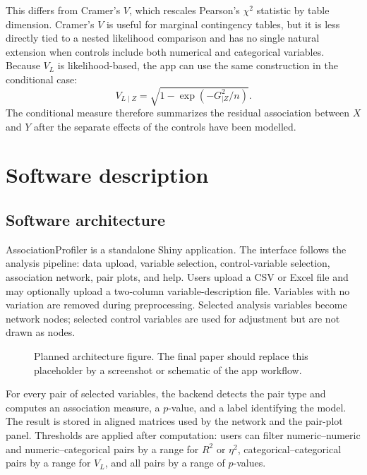 \documentclass[preprint,12pt,a4paper]{elsarticle}
\begin{document}
This differs from Cramer's $V$, which rescales Pearson's $\chi^2$ statistic by table dimension. Cramer's $V$ is useful for marginal contingency tables, but it is less directly tied to a nested likelihood comparison and has no single natural extension when controls include both numerical and categorical variables. Because $V_L$ is likelihood-based, the app can use the same construction in the conditional case:
\[
V_{L\mid Z} = \sqrt{1-\exp(-G^2_{\mid Z}/n)}.
\]
The conditional measure therefore summarizes the residual association between $X$ and $Y$ after the separate effects of the controls have been modelled.

\section{Software description}

\subsection{Software architecture}

AssociationProfiler is a standalone Shiny application. The interface follows the analysis pipeline: data upload, variable selection, control-variable selection, association network, pair plots, and help. Users upload a CSV or Excel file and may optionally upload a two-column variable-description file. Variables with no variation are removed during preprocessing. Selected analysis variables become network nodes; selected control variables are used for adjustment but are not drawn as nodes.

\begin{figure}[!ht]
\centering
{}
\caption{Planned architecture figure. The final paper should replace this placeholder by a screenshot or schematic of the app workflow.}
\label{fig:workflow}
\end{figure}

For every pair of selected variables, the backend detects the pair type and computes an association measure, a $p$-value, and a label identifying the model. The result is stored in aligned matrices used by the network and the pair-plot panel. Thresholds are applied after computation: users can filter numeric--numeric and numeric--categorical pairs by a range for $R^2$ or $\eta^2$, categorical--categorical pairs by a range for $V_L$, and all pairs by a range of $p$-values.
\end{document}
